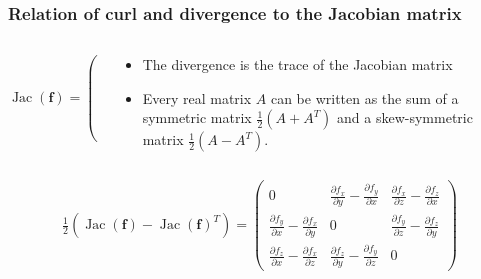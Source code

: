 \documentclass[aspectratio=169]{beamer}
\newcommand{\ff}{\mathbf{f}}
\begin{document}
\begin{frame}
    \frametitle{Relation of curl and divergence to the Jacobian matrix}


    \begin{columns}
        \begin{column}{.3\textwidth}

            \[
                \operatorname{Jac}(\ff) =
                \begin{pmatrix}
                    \frac{\partial f_x}{\partial x}
                     & \frac{\partial f_x}{\partial y}
                     & \frac{\partial f_x}{\partial z} \\[1em]
                    \frac{\partial f_y}{\partial x}
                     & \frac{\partial f_y}{\partial y}
                     & \frac{\partial f_y}{\partial z} \\[1em]
                    \frac{\partial f_z}{\partial x}
                     & \frac{\partial f_z}{\partial y}
                     & \frac{\partial f_z}{\partial z}
                \end{pmatrix}
            \]



        \end{column}
        \begin{column}{.6\textwidth}
            \begin{itemize}
                \item     The divergence is the trace of the Jacobian matrix
                \item Every real matrix \(A\) can be written as the sum of a symmetric matrix \(\frac{1}{2}(A + A^{T})\) and a skew-symmetric matrix \(\frac{1}{2}(A - A^{T})\).

            \end{itemize}

        \end{column}
    \end{columns}

    \vspace{2em}

    \[
        \tfrac{1}{2}(\operatorname{Jac}(\ff) - \operatorname{Jac}(\ff)^{T}) =
        \begin{pmatrix}
            0
             & \frac{\partial f_x}{\partial y} - \frac{\partial f_y}{\partial x}
             & \frac{\partial f_x}{\partial z} - \frac{\partial f_z}{\partial x}
            \\[1em]
            \frac{\partial f_y}{\partial x} - \frac{\partial f_x}{\partial y}
             & 0
             & \frac{\partial f_y}{\partial z} - \frac{\partial f_z}{\partial y}
            \\[1em]
            \frac{\partial f_z}{\partial x}  - \frac{\partial f_x}{\partial z}
             & \frac{\partial f_z}{\partial y}  - \frac{\partial f_y}{\partial z}
             & 0
        \end{pmatrix}
    \]


\end{frame}
\end{document}
